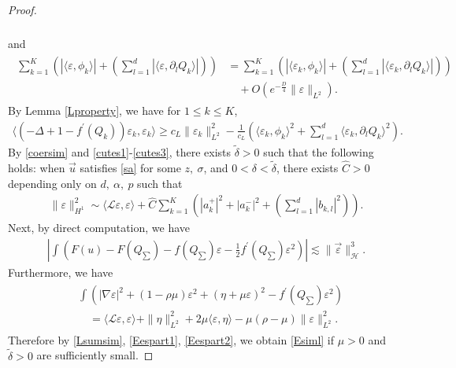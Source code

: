 \documentclass[reqno]{amsart}
\theoremstyle{plain}
\theoremstyle{definition}
\numberwithin{equation}{section}
\newcommand{\1}{\mathbbm{1}}
\begin{document}
\begin{proof}
\begin{align}
\begin{aligned}
\end{aligned}
\end{align}
and
\begin{align}\label{cutes2}
\begin{aligned}
\sum_{k=1}^K\left(|\langle \varepsilon,\phi_k\rangle|+\left(\sum_{l=1}^d|\langle \varepsilon,{\partial}_lQ_k\rangle|\right) \right)&=\sum_{k=1}^K\left(|\langle \varepsilon_k,\phi_k\rangle|+\left(\sum_{l=1}^d|\langle \varepsilon_k,{\partial}_lQ_k\rangle|\right) \right)
\\
&\quad +O(e^{-\frac{D}{4}}\|\varepsilon\|_{L^2}).
\end{aligned}
\end{align}
By Lemma \ref{Lproperty}, we have for $1\leq k\leq K$,
\begin{align}\label{cutes3}
\langle (-\Delta+1-f^{\prime}(Q_k))\varepsilon_k,\varepsilon_k\rangle\geq c_L\|\varepsilon_k\|_{L^2}^2-\frac{1}{c_L}\left(\langle \varepsilon_k,\phi_k\rangle^2+\sum_{l=1}^d\langle\varepsilon_k,{\partial}_lQ_k\rangle^2\right).
\end{align}
By \eqref{coersim} and \eqref{cutes1}-\eqref{cutes3}, there exists $\tilde{\delta}>0$ such that the following holds: when $\vec{u}$ satisfies \eqref{sa} for some $z,\ \sigma$, and $0<\delta<\tilde{\delta}$, there exists $\hat{C}>0$ depending only on $d,\ \alpha,\ p$ such that 
\begin{align}\label{Lsumsim}
\|\varepsilon\|_{H^1}^2\sim \langle \mathcal{L}\varepsilon,\varepsilon\rangle+\hat{C} \sum_{k=1}^K\left( |a_k^+|^2+|a_k^-|^2+\left(\sum_{l=1}^d|b_{k,l}|^2\right)\right).
\end{align}
Next, by direct computation, we have
\begin{align}\label{Eespart1}
\left|\int(F(u)-F(Q_{\sum})-f(Q_{\sum})\varepsilon-\frac{1}{2}f^{\prime}(Q_{\sum})\varepsilon^2)\right|\lesssim \|\vec{\varepsilon}\|_{\mathcal{H}}^3.
\end{align}
Furthermore, we have
\begin{align}\label{Eespart2}
\begin{aligned}
&\int  (|\nabla\varepsilon|^2+(1-\rho \mu)\varepsilon^2+(\eta+\mu \varepsilon)^2-f^{\prime}(Q_{\sum})\varepsilon^2)
\\
&\quad=\langle \mathcal{L}\varepsilon,\varepsilon\rangle +\|\eta\|_{L^2}^2+2\mu \langle \varepsilon,\eta\rangle -\mu(\rho-\mu)\|\varepsilon\|_{L^2}^2.
\end{aligned}
\end{align}
Therefore by \eqref{Lsumsim}, \eqref{Eespart1}, \eqref{Eespart2}, we obtain \eqref{Esiml} if $\mu>0$ and $\tilde{\delta}>0$ are sufficiently small.



\end{proof}
\end{document}
